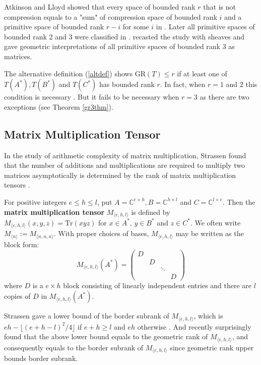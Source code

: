 \documentclass[10pt]{article} %
\newcommand{\GR}{\mathrm{GR}}
\newcommand{\BC}{\mathbb{C}}
\theoremstyle{definition}
\begin{document}

Atkinson and Lloyd showed that every space of bounded rank $r$ that is not compression equals to a "sum" of compression space of bounded rank $i$ and a primitive space of bounded rank $r-i$ for some $i$ in \cite{Atk81}. Later all primitive spaces of bounded rank 2 and 3 were classified in \cite{Atk83}. \cite{EH88} recasted the study with sheaves and gave geometric interpretations of all primitive spaces of bounded rank 3 as matrices.

The alternative definition (\ref{altdef}) shows $\GR(T)\leq r$ if at least one of $T(A^*), T(B^*)$ and $T(C^*)$ has bounded rank $r$. In fact, when $r=1$ and $2$ this condition is necessary \cite{GL20}. But it fails to be necessary when $r=3$ as there are two exceptions (see Theorem \ref{gr3thm}).

\subsection{Matrix Multiplication Tensor}
In the study of arithmetic complexity of matrix multiplication, Strassen found that the number of additions and multiplications are required to multiply two matrices asymptotically is determined by the rank of matrix multiplication tensors \cite{str87}. 

For positive integers $e\leq h\leq l$, put $A=\BC^{e\times h},B=\BC^{h\times l}$ and $C=\BC^{l\times e}$. Then the \textbf{matrix multiplication tensor} $M_{\langle e,h,l \rangle}$ is defined by $M_{\langle e,h,l \rangle}(x,y,z)=\mathrm{Tr}(xyz)$ for $x\in A^*$, $y\in B^*$ and $z\in C^*$. We often write $M_{\langle n\rangle}:=M_{\langle n,n,n\rangle}$. With proper choices of bases, $M_{\langle e,h,l \rangle}$ may be written as the block form:
\begin{equation}\label{mm}
M_{\langle e,h,l \rangle}(A^*)=
\begin{pmatrix}
D & & &\\
&D&&\\
&&\ddots &\\
&&&D
\end{pmatrix}
\end{equation}
where $D$ is a $e\times h$ block consisting of linearly independent entries and there are $l$ copies of $D$ in $M_{\langle e,h,l \rangle}(A^*)$.

Strassen gave a lower bound of the border subrank of $M_{\langle e,h,l \rangle}$, which is $eh-\lfloor (e+h-l)^2/4\rfloor$ if $e+h\geq l$ and $eh$ otherwise \cite{str87}. And recently \cite{KMZ20} surprisingly found that the above lower bound equals to the geometric rank of $M_{\langle e,h,l \rangle}$, and consequently equals to the border subrank of $M_{\langle e,h,l \rangle}$ since geometric rank upper bounds border subrank.
\end{document}

